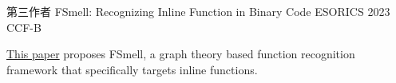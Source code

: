 

\begin{cventries}

  \cventry
    {第三作者} %
    {FSmell: Recognizing Inline Function in Binary Code} %
    {ESORICS 2023} %
    {CCF-B} %
    {
      \begin{cvitems} %
        \item {\href{https://www.esorics2023.org/program/accepted_papers/}{\textcolor{awesome-skyblue}{This paper}} proposes FSmell, a graph theory based function recognition framework that specifically targets inline functions.}
      \end{cvitems}
    }

\end{cventries}
